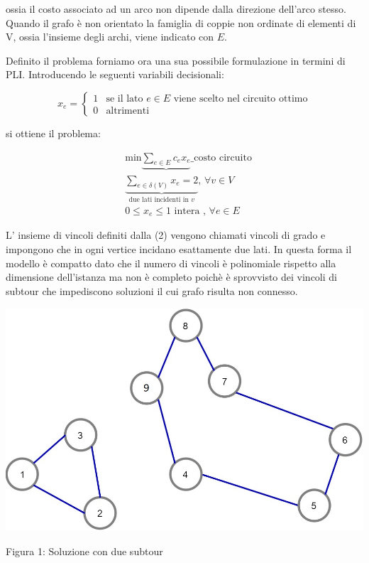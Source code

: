 \documentclass[11pt]{article}
\begin{document}
ossia il costo associato ad un arco non dipende dalla direzione dell'arco stesso. Quando il grafo è non orientato la famiglia di coppie non ordinate di elementi di V, ossia l'insieme degli archi, viene indicato con $E$.


Definito il problema forniamo ora una sua possibile formulazione in termini di PLI. Introducendo le seguenti variabili decisionali:

\[
x_{e}=
\begin{cases}
1 & \text{se il lato $e \in E$ viene scelto nel circuito ottimo} \\
0 & \text{altrimenti}
\end{cases}
\]

si ottiene il problema:

\begin{eqnarray}
& \text{min}\displaystyle\underbrace{\sum_{e \in E} c_e x_e}\_{\text{costo circuito}} \\[1.5ex]
&\displaystyle\underbrace{\sum_{e \in \delta(V)} x_e = 2}_{\text{due lati incidenti in }v}\text{,  }\forall v \in V \\[1.5ex]
&0\leq x_e \leq 1 \text{ intera , }\forall e \in E
\end{eqnarray}

L' insieme di vincoli definiti dalla (2) vengono chiamati vincoli di grado e impongono che in ogni vertice incidano esattamente due lati. In questa forma il modello è  compatto dato che il numero di vincoli è polinomiale rispetto alla dimensione dell'istanza ma non è completo poichè è sprovvisto dei vincoli di subtour che impediscono soluzioni il cui grafo risulta non connesso.

\begin{center}
\includegraphics[scale=0.5]{subtour}  

Figura 1: Soluzione con due subtour
\end{center}
\end{document}
